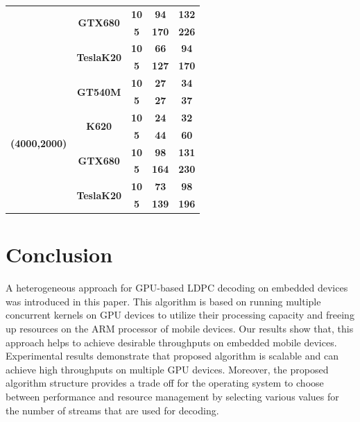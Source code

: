 \documentclass[conference]{IEEEtran}
\begin{document}
\begin{table}[h]
\begin{tabular}{@{}cc|c|cc@{}}
                                     & \multirow{2}{*}{\textbf{GTX680}}   & \textbf{10}   & \textbf{94}  & \textbf{132}  \\ \cmidrule(l){3-5}
                                     &                                    & \textbf{5}    & \textbf{170} & \textbf{226}   \\ \cmidrule(l){2-5}
                                     & \multirow{2}{*}{\textbf{TeslaK20}} & \textbf{10}   & \textbf{66}  & \textbf{94}   \\ \cmidrule(l){3-5}
                                     &                                    & \textbf{5}    & \textbf{127} & \textbf{170}  \\ \midrule
\multirow{8}{*}{\textbf{(4000,2000)}}& \multirow{2}{*}{\textbf{GT540M}}   & \textbf{10}   & \textbf{27}  & \textbf{34}   \\ \cmidrule(l){3-5} 
                                     &                                    & \textbf{5}    & \textbf{27}  & \textbf{37}   \\ \cmidrule(l){2-5} 
                                     & \multirow{2}{*}{\textbf{K620}}     & \textbf{10}   & \textbf{24}  & \textbf{32}   \\ \cmidrule(l){3-5}
                                     &                                    & \textbf{5}    & \textbf{44}   & \textbf{60}   \\ \cmidrule(l){2-5}
                                     & \multirow{2}{*}{\textbf{GTX680}}   & \textbf{10}   & \textbf{98}  & \textbf{131}  \\ \cmidrule(l){3-5}
                                     &                                    & \textbf{5}    & \textbf{164}  & \textbf{230}  \\ \cmidrule(l){2-5}
                                     & \multirow{2}{*}{\textbf{TeslaK20}} & \textbf{10}   & \textbf{73}  & \textbf{98}   \\ \cmidrule(l){3-5}
                                     &                                    & \textbf{5}    & \textbf{139} & \textbf{196}  \\ \bottomrule
\end{tabular}
\end{table}

\section{Conclusion}
A heterogeneous approach for GPU-based LDPC decoding on embedded devices was introduced in this paper. This algorithm is based on running multiple concurrent kernels on GPU devices to utilize their processing capacity and freeing up resources on the ARM processor of mobile devices. Our results show that, this approach helps to achieve desirable throughputs on embedded mobile devices. Experimental results demonstrate that proposed algorithm is scalable and can achieve high throughputs on multiple GPU devices. Moreover, the proposed algorithm structure provides a trade off for the operating system to choose between performance and resource management by selecting various values for the number of streams that are used for decoding.

\newpage






\end{document}
